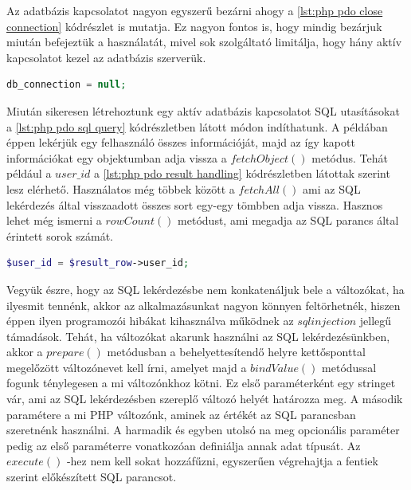 \documentclass[12pt]{report}
\theoremstyle{definition}
\begin{document}
	Az adatbázis kapcsolatot nagyon egyszerű bezárni ahogy a \ref{lst:php pdo close connection} kódrészlet is mutatja. Ez nagyon fontos is, hogy mindig bezárjuk miután befejeztük a használatát, mivel sok szolgáltató limitálja, hogy hány aktív kapcsolatot kezel az adatbázis szerverük.
	
	\noindent\begin{minipage}{\linewidth}
		\begin{lstlisting}[language=php,label={lst:php pdo close connection}, caption={PHP PDO kapcsolat lezárása}]
db_connection = null;
		\end{lstlisting}
	\end{minipage}
	
	Miután sikeresen létrehoztunk egy aktív adatbázis kapcsolatot SQL utasításokat a \ref{lst:php pdo sql query} kódrészletben látott módon indíthatunk. A példában éppen lekérjük egy felhasználó összes információját, majd az így kapott információkat egy objektumban adja vissza a \linebreak$fetchObject\left(\right)$ metódus. Tehát például a $user\_id$ a \ref{lst:php pdo result handling} kódrészletben látottak szerint lesz elérhető. Használatos még többek között a $fetchAll\left(\right)$ ami az SQL lekérdezés által visszaadott összes sort egy-egy tömbben adja vissza. Hasznos lehet még ismerni a $rowCount\left(\right)$ metódust, ami megadja az SQL parancs által érintett sorok számát.
	
	\noindent\begin{minipage}{\linewidth}
		\begin{lstlisting}[language=php,label={lst:php pdo result handling}, caption={PHP PDO eredmény kezelés}]
$user_id = $result_row->user_id;
		\end{lstlisting}
	\end{minipage}
	
	Vegyük észre, hogy az SQL lekérdezésbe nem konkatenáljuk bele a változókat, ha ilyesmit tennénk, akkor az alkalmazásunkat nagyon könnyen feltörhetnék, hiszen éppen ilyen programozói hibákat kihasználva működnek az $sql injection$ jellegű támadások. Tehát, ha változókat akarunk használni az SQL lekérdezésünkben, akkor a $prepare\left(\right)$ metódusban a behelyettesítendő helyre kettősponttal megelőzött változónevet kell írni, amelyet majd a $bindValue\left(\right)$ metódussal fogunk ténylegesen a mi változónkhoz kötni. Ez első paraméterként egy stringet vár, ami az SQL lekérdezésben szereplő változó helyét határozza meg. A második paramétere a mi PHP változónk, aminek az értékét az SQL parancsban szeretnénk használni. A harmadik és egyben utolsó na meg opcionális paraméter pedig az első paraméterre vonatkozóan definiálja annak adat típusát. Az $execute\left(\right)$ -hez nem kell sokat hozzáfűzni, egyszerűen végrehajtja a fentiek szerint előkészített SQL parancsot.
	
\end{document}
